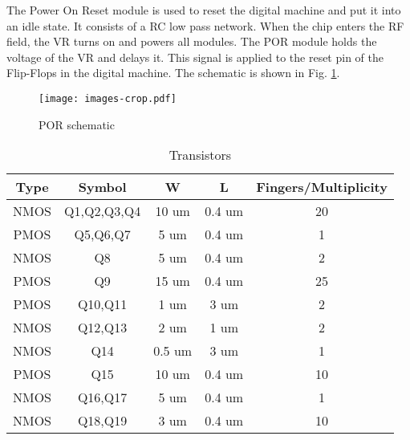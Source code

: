 The Power On Reset module is used to reset the digital machine and put it into an idle state. It consists of a RC low pass network. When the chip enters the RF field, the VR turns on and powers all modules. The POR module holds the voltage of the VR and delays it. This signal is applied to the reset pin of the Flip-Flops in the digital machine. The schematic is shown in Fig. \ref{fig:por}. 

\begin{figure}[h]
  \centering
  \texttt{[image: images-crop.pdf]}
  \caption{POR schematic}
  \label{fig:por}
\end{figure}


\begin{table}[h]
\centering
\caption{Transistors}
\label{trans_specs}
\begin{tabular}{c|c|c|c|c}
\textbf{Type}  & \textbf{Symbol}& \textbf{W}  & \textbf{L}  & \textbf{Fingers/Multiplicity}  \\ \hline
NMOS                 & Q1,Q2,Q3,Q4    & 10 um       & 0.4 um      & 20                \\
PMOS                 & Q5,Q6,Q7       & 5 um        & 0.4 um      & 1                 \\
NMOS                 & Q8             & 5 um        & 0.4 um      & 2                 \\
PMOS                 & Q9             & 15 um       & 0.4 um      & 25                \\
PMOS                 & Q10,Q11        & 1 um        & 3 um        & 2                 \\
NMOS                 & Q12,Q13        & 2 um        & 1 um        & 2                 \\
NMOS                 & Q14            & 0.5 um      & 3 um        & 1                 \\
PMOS                 & Q15            & 10 um       & 0.4 um      & 10                \\
NMOS                 & Q16,Q17        & 5 um        & 0.4 um      & 1                 \\
NMOS                 & Q18,Q19        & 3 um        & 0.4 um      & 10                \\
\end{tabular}
\end{table}

